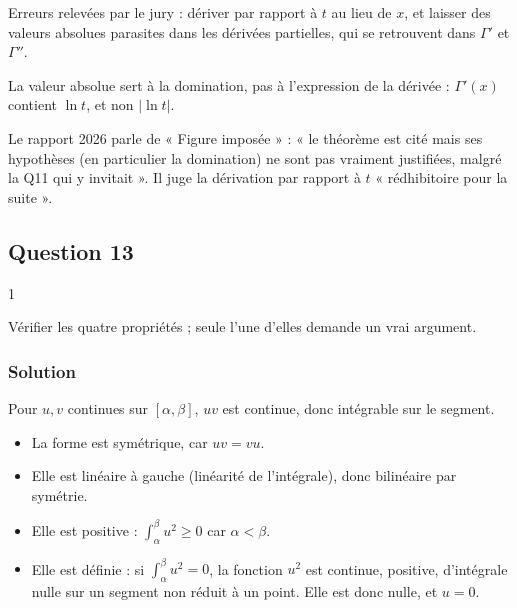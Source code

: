 \documentclass[11pt,a4paper]{article}
\providecommand{\tightlist}{\setlength{\itemsep}{0pt}\setlength{\parskip}{0pt}}
\newcommand{\equationajustee}[1]{%
  \sbox{\boiteequation}{$\displaystyle #1$}%
  \ifdim\wd\boiteequation>\linewidth
    \[\resizebox{\linewidth}{!}{\usebox{\boiteequation}}\]%
  \else
    \[#1\]%
  \fi}
\begin{document}
\equationajustee{\boxed{\Gamma''(x)=\int_0^{+\infty}(\ln t)^2\,t^{x-1}e^{-t}\,\mathrm dt}}

\begin{piege}

Erreurs relevées par le jury : dériver par rapport à \(t\) au lieu de \(x\), et laisser des valeurs absolues parasites dans les dérivées partielles, qui se retrouvent dans \(\Gamma'\) et \(\Gamma''\).

La valeur absolue sert à la domination, pas à l'expression de la dérivée : \(\Gamma'(x)\) contient \(\ln t\), et non \(|\ln t|\).

\end{piege}

\begin{jury}

Le rapport 2026 parle de « Figure imposée » : « le théorème est cité mais ses hypothèses (en particulier la domination) ne sont pas vraiment justifiées, malgré la Q11 qui y invitait ». Il juge la dérivation par rapport à \(t\) « rédhibitoire pour la suite ».

\end{jury}

\hypertarget{question-13}{%
\subsection{Question 13}\label{question-13}}

\begin{indication}{1}

Vérifier les quatre propriétés ; seule l'une d'elles demande un vrai argument.

\end{indication}

\hypertarget{solution-12}{%
\subsubsection{Solution}\label{solution-12}}

Pour \(u,v\) continues sur \([\alpha,\beta]\), \(uv\) est continue, donc intégrable sur le segment.

\begin{itemize}
\tightlist
\item
  La forme est symétrique, car \(uv=vu\).
\item
  Elle est linéaire à gauche (linéarité de l'intégrale), donc bilinéaire par symétrie.
\item
  Elle est positive : \(\int_\alpha^\beta u^2\ge0\) car \(\alpha<\beta\).
\item
  Elle est définie : si \(\int_\alpha^\beta u^2=0\), la fonction \(u^2\) est continue, positive, d'intégrale nulle sur un segment non réduit à un point. Elle est donc nulle, et \(u=0\).
\end{itemize}
\end{document}
